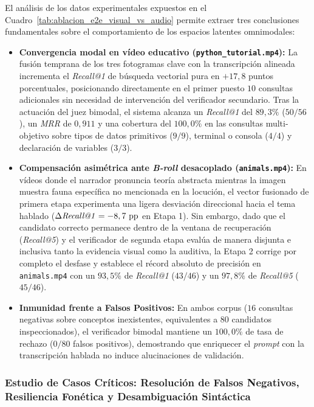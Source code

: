 El análisis de los datos experimentales expuestos en el Cuadro~\ref{tab:ablacion_e2e_visual_vs_audio} permite extraer tres conclusiones fundamentales sobre el comportamiento de los espacios latentes omnimodales: %
\begin{itemize}
    \item \textbf{Convergencia modal en vídeo educativo (\texttt{python\_tutorial.mp4}):} La fusión temprana de los tres fotogramas clave con la transcripción alineada incrementa el \textit{Recall@1} de búsqueda vectorial pura en $+17,8$ puntos porcentuales, posicionando directamente en el primer puesto $10$ consultas adicionales sin necesidad de intervención del verificador secundario. %
    Tras la actuación del juez bimodal, el sistema alcanza un \textit{Recall@1} del $89,3\%$ ($50/56$), un \textit{MRR} de $0,911$ y una cobertura del $100,0\%$ en las consultas multi-objetivo sobre tipos de datos primitivos ($9/9$), terminal o consola ($4/4$) y declaración de variables ($3/3$). %
    \item \textbf{Compensación asimétrica ante \textit{B-roll} desacoplado (\texttt{animals.mp4}):} En vídeos donde el narrador pronuncia teoría abstracta mientras la imagen muestra fauna específica no mencionada en la locución, el vector fusionado de primera etapa experimenta una ligera desviación direccional hacia el tema hablado ($\Delta\text{\textit{Recall@1}} = -8,7\text{ pp}$ en Etapa 1). %
    Sin embargo, dado que el candidato correcto permanece dentro de la ventana de recuperación (\textit{Recall@5}) y el verificador de segunda etapa evalúa de manera disjunta e inclusiva tanto la evidencia visual como la auditiva, la Etapa 2 corrige por completo el desfase y establece el récord absoluto de precisión en \texttt{animals.mp4} con un $93,5\%$ de \textit{Recall@1} ($43/46$) y un $97,8\%$ de \textit{Recall@5} ($45/46$). %
    \item \textbf{Inmunidad frente a Falsos Positivos:} En ambos corpus ($16$ consultas negativas sobre conceptos inexistentes, equivalentes a $80$ candidatos inspeccionados), el verificador bimodal mantiene un $100,0\%$ de tasa de rechazo ($0/80$ falsos positivos), demostrando que enriquecer el \textit{prompt} con la transcripción hablada no induce alucinaciones de validación. %
\end{itemize}

\subsubsection{Estudio de Casos Críticos: Resolución de Falsos Negativos, Resiliencia Fonética y Desambiguación Sintáctica}
\label{subsubsec:estudio_casos_criticos_audio}


